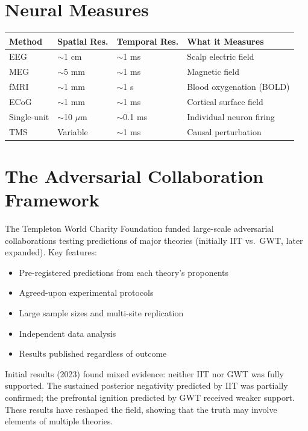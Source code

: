 \documentclass[11pt,a4paper]{report}
\begin{document}
\section{Neural Measures}

\begin{center}
\renewcommand{\arraystretch}{1.3}
\begin{tabular}{>{\raggedright}p{2.5cm} >{\raggedright}p{3cm} >{\raggedright}p{3cm} >{\raggedright\arraybackslash}p{4cm}}
  \toprule
  \textbf{Method} & \textbf{Spatial Res.} & \textbf{Temporal Res.} & \textbf{What it Measures} \\
  \midrule
  EEG & $\sim$1 cm & $\sim$1 ms & Scalp electric field \\
  MEG & $\sim$5 mm & $\sim$1 ms & Magnetic field \\
  fMRI & $\sim$1 mm & $\sim$1 s & Blood oxygenation (BOLD) \\
  ECoG & $\sim$1 mm & $\sim$1 ms & Cortical surface field \\
  Single-unit & $\sim$10 $\mu$m & $\sim$0.1 ms & Individual neuron firing \\
  TMS & Variable & $\sim$1 ms & Causal perturbation \\
  \bottomrule
\end{tabular}
\end{center}

\section{The Adversarial Collaboration Framework}

\begin{principlebox}
The Templeton World Charity Foundation funded large-scale adversarial collaborations testing predictions of major theories (initially IIT vs.\ GWT, later expanded). Key features:
\begin{itemize}[leftmargin=1.5em]
  \item Pre-registered predictions from each theory's proponents
  \item Agreed-upon experimental protocols
  \item Large sample sizes and multi-site replication
  \item Independent data analysis
  \item Results published regardless of outcome
\end{itemize}
Initial results (2023) found mixed evidence: neither IIT nor GWT was fully supported. The sustained posterior negativity predicted by IIT was partially confirmed; the prefrontal ignition predicted by GWT received weaker support. These results have reshaped the field, showing that the truth may involve elements of multiple theories.
\end{principlebox}
\end{document}
